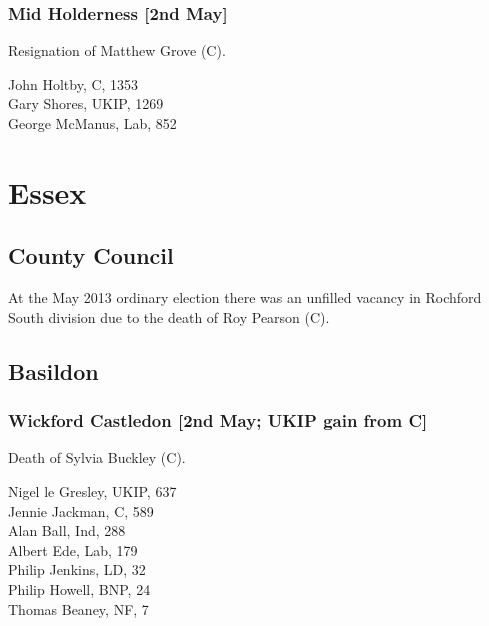 \documentclass[a4paper,openany,10pt]{book}
\begin{document}
\subsubsection*{Mid Holderness \hspace*{\fill}\nolinebreak[1]%
\enspace\hspace*{\fill}
[2nd May]}


Resignation of Matthew Grove (C).



John Holtby, C, 1353\\
Gary Shores, UKIP, 1269\\
George McManus, Lab, 852\\


\vfill

\section{Essex}

\subsection*{County Council}

At the May 2013 ordinary election there was an unfilled vacancy in Rochford South division due to the death of Roy Pearson (C).


\subsection*{Basildon}

\subsubsection*{Wickford Castledon \hspace*{\fill}\nolinebreak[1]%
\enspace\hspace*{\fill}
[2nd May; UKIP gain from C]}


Death of Sylvia Buckley (C).



Nigel le Gresley, UKIP, 637\\
Jennie Jackman, C, 589\\
Alan Ball, Ind, 288\\
Albert Ede, Lab, 179\\
Philip Jenkins, LD, 32\\
Philip Howell, BNP, 24\\
Thomas Beaney, NF, 7\\
\end{document}
